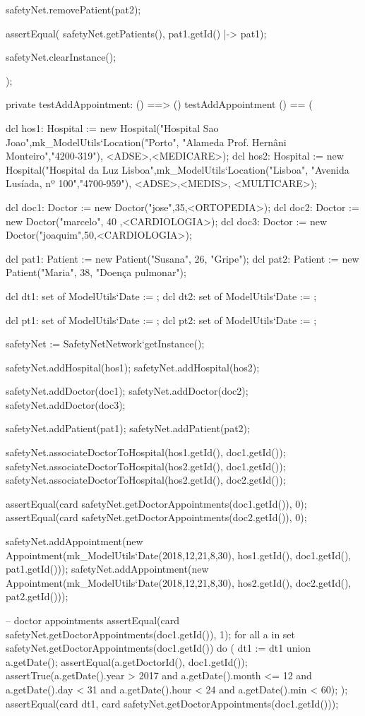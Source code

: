 \begin{vdmpp}[breaklines=true]
  safetyNet.removePatient(pat2);

  assertEqual( safetyNet.getPatients(), {pat1.getId() |-> pat1});
  
  safetyNet.clearInstance();
    
);

private testAddAppointment: () ==> ()
 testAddAppointment () == (
 
  dcl hos1: Hospital := new Hospital("Hospital Sao Joao",mk_ModelUtils`Location("Porto", "Alameda Prof. Hernâni Monteiro","4200-319"), {<ADSE>,<MEDICARE>});
  dcl hos2: Hospital := new Hospital("Hospital da Luz Lisboa",mk_ModelUtils`Location("Lisboa", "Avenida Lusíada, nº 100","4700-959"), {<ADSE>,<MEDIS>, <MULTICARE>});
  
  dcl doc1: Doctor := new Doctor("jose",35,<ORTOPEDIA>);
  dcl doc2: Doctor := new Doctor("marcelo", 40 ,<CARDIOLOGIA>);
  dcl doc3: Doctor := new Doctor("joaquim",50,<CARDIOLOGIA>);
  
  dcl pat1: Patient := new Patient("Susana", 26, "Gripe");
  dcl pat2: Patient := new Patient("Maria", 38, "Doença pulmonar");
  
  dcl dt1: set of ModelUtils`Date := {};
  dcl dt2: set of ModelUtils`Date := {};
  
  dcl pt1: set of ModelUtils`Date := {};
  dcl pt2: set of ModelUtils`Date := {};
  
  safetyNet := SafetyNetNetwork`getInstance();
   
  safetyNet.addHospital(hos1);
  safetyNet.addHospital(hos2);
  
  safetyNet.addDoctor(doc1);
  safetyNet.addDoctor(doc2);
  safetyNet.addDoctor(doc3);
  
  safetyNet.addPatient(pat1);
  safetyNet.addPatient(pat2);

  safetyNet.associateDoctorToHospital(hos1.getId(), doc1.getId());
  safetyNet.associateDoctorToHospital(hos2.getId(), doc1.getId());
  safetyNet.associateDoctorToHospital(hos2.getId(), doc2.getId());

  assertEqual(card safetyNet.getDoctorAppointments(doc1.getId()), 0);
  assertEqual(card safetyNet.getDoctorAppointments(doc2.getId()), 0);

  safetyNet.addAppointment(new Appointment(mk_ModelUtils`Date(2018,12,21,8,30), hos1.getId(), doc1.getId(), pat1.getId()));
  safetyNet.addAppointment(new Appointment(mk_ModelUtils`Date(2018,12,21,8,30), hos2.getId(), doc2.getId(), pat2.getId()));

  -- doctor appointments
  assertEqual(card safetyNet.getDoctorAppointments(doc1.getId()), 1);
  for all a in set safetyNet.getDoctorAppointments(doc1.getId()) do (
   dt1 := dt1 union {a.getDate()};
   assertEqual(a.getDoctorId(), doc1.getId());
   assertTrue(a.getDate().year > 2017 and a.getDate().month <= 12 and a.getDate().day < 31 and a.getDate().hour < 24 and a.getDate().min < 60);
  );
  assertEqual(card dt1, card safetyNet.getDoctorAppointments(doc1.getId()));
  

\end{vdmpp}
